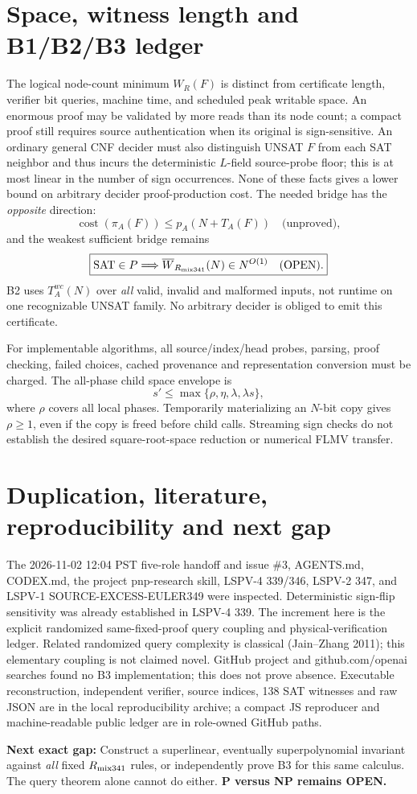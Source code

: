 \documentclass[11pt]{article}
\begin{document}
\section*{Space, witness length and B1/B2/B3 ledger}
The logical node-count minimum $W_R(F)$ is distinct from certificate length, verifier bit queries, machine time, and scheduled peak writable space. An enormous proof may be validated by more reads than its node count; a compact proof still requires source authentication when its original is sign-sensitive. An ordinary general CNF decider must also distinguish UNSAT $F$ from each SAT neighbor and thus incurs the deterministic $L$-field source-probe floor; this is at most linear in the number of sign occurrences. None of these facts gives a lower bound on arbitrary decider proof-production cost. The needed bridge has the \emph{opposite} direction:
\[
\operatorname{cost}(\pi_A(F))\le p_A(N+T_A(F))\quad\text{(unproved)},
\]
and the weakest sufficient bridge remains
\[
\boxed{\mathrm{SAT}\in P\Longrightarrow\overline W_{R_{\rm mix341}}(N)\in N^{O(1)}\quad\text{(OPEN)}.}
\]
B2 uses $T_A^{wc}(N)$ over \emph{all} valid, invalid and malformed inputs, not runtime on one recognizable UNSAT family. No arbitrary decider is obliged to emit this certificate.

For implementable algorithms, all source/index/head probes, parsing, proof checking, failed choices, cached provenance and representation conversion must be charged. The all-phase child space envelope is
\[
s'\le\max\{\rho,\eta,\lambda,\lambda s\},
\]
where $\rho$ covers all local phases. Temporarily materializing an $N$-bit copy gives $\rho\ge1$, even if the copy is freed before child calls. Streaming sign checks do not establish the desired square-root-space reduction or numerical FLMV transfer.

\section*{Duplication, literature, reproducibility and next gap}
The 2026-11-02 12:04 PST five-role handoff and issue \#3, AGENTS.md, CODEX.md, the project pnp-research skill, LSPV-4 339/346, LSPV-2 347, and LSPV-1 SOURCE-EXCESS-EULER349 were inspected. Deterministic sign-flip sensitivity was already established in LSPV-4 339. The increment here is the explicit randomized same-fixed-proof query coupling and physical-verification ledger. Related randomized query complexity is classical (Jain--Zhang 2011); this elementary coupling is not claimed novel. GitHub project and github.com/openai searches found no B3 implementation; this does not prove absence. Executable reconstruction, independent verifier, source indices, 138 SAT witnesses and raw JSON are in the local reproducibility archive; a compact JS reproducer and machine-readable public ledger are in role-owned GitHub paths.
\par\noindent\textbf{Next exact gap:} Construct a superlinear, eventually superpolynomial invariant against \emph{all} fixed $R_{\rm mix341}$ rules, or independently prove B3 for this same calculus. The query theorem alone cannot do either. \textbf{P versus NP remains OPEN.}
\end{document}
